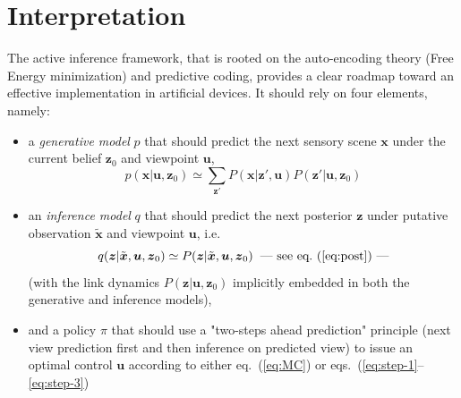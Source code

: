 \documentclass{article} %
\begin{document}

\section{Interpretation}

The active inference framework, that is rooted on the auto-encoding theory (Free Energy minimization) and predictive coding, provides a clear roadmap toward an effective implementation in artificial devices. It should rely on four elements, namely:
\begin{itemize}
	\item a \emph{generative model} $p$ that should predict the next sensory scene $\boldsymbol{x}$ under the current belief $\boldsymbol{z}_0$ and viewpoint $\boldsymbol{u}$, 
$$p(\boldsymbol{x}|\boldsymbol{u}, \boldsymbol{z}_0) \simeq \sum_{\boldsymbol{z}'}P(\boldsymbol{x}|\boldsymbol{z}',\boldsymbol{u}) P(\boldsymbol{z}'|\boldsymbol{u},\boldsymbol{z}_0) $$
   \item an \emph{inference model} $q$ that should predict the next posterior $\boldsymbol{z}$ under putative observation $\tilde{\boldsymbol{x}}$ and viewpoint $\boldsymbol{u}$, i.e.
$$q(\boldsymbol{z}|\tilde{\boldsymbol{x}}, \boldsymbol{u},\boldsymbol{z}_0) \simeq  P(\boldsymbol{z}|\tilde{\boldsymbol{x}}, \boldsymbol{u},\boldsymbol{z}_0) \text{\hspace{.2cm}---~see eq.~(\ref{eq:post})~---}$$  %
(with the link dynamics $P(\boldsymbol{z}|\boldsymbol{u},\boldsymbol{z}_0)$ implicitly embedded in both the generative and inference models),
\item and a policy $\pi$ that should use a "two-steps ahead prediction" principle (next view prediction first and then inference on predicted view) to issue an optimal control $\boldsymbol{u}$ according to either eq.~(\ref{eq:MC}) or eqs.~(\ref{eq:step-1}--\ref{eq:step-3})
\end{itemize}  
\end{document}

